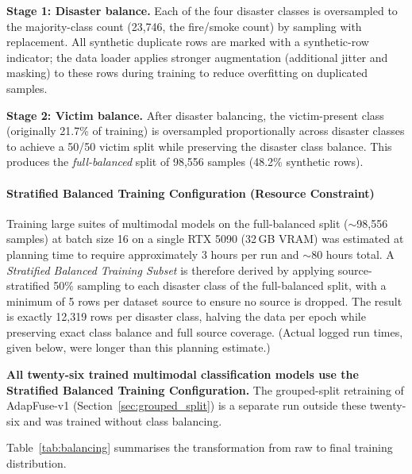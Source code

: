 \documentclass[journal]{IEEEtran}
\begin{document}
\textbf{Stage 1: Disaster balance.} Each of the four disaster classes is oversampled to the majority-class count (23{,}746, the fire/smoke count) by sampling with replacement. All synthetic duplicate rows are marked with a synthetic-row indicator; the data loader applies stronger augmentation (additional jitter and masking) to these rows during training to reduce overfitting on duplicated samples.

\textbf{Stage 2: Victim balance.} After disaster balancing, the victim-present class (originally 21.7\% of training) is oversampled proportionally across disaster classes to achieve a 50/50 victim split while preserving the disaster class balance. This produces the \textit{full-balanced} split of 98{,}556 samples (48.2\% synthetic rows).

\paragraph{Stratified Balanced Training Configuration (Resource Constraint)}

Training large suites of multimodal models on the full-balanced split ($\sim$98{,}556 samples) at batch size 16 on a single RTX 5090 (32\,GB VRAM) was estimated at planning time to require approximately 3 hours per run and $\sim$80 hours total. A \textit{Stratified Balanced Training Subset} is therefore derived by applying source-stratified 50\% sampling to each disaster class of the full-balanced split, with a minimum of 5 rows per dataset source to ensure no source is dropped. The result is exactly 12{,}319 rows per disaster class, halving the data per epoch while preserving exact class balance and full source coverage. (Actual logged run times, given below, were longer than this planning estimate.)

\textbf{All twenty-six trained multimodal classification models use the Stratified Balanced Training Configuration.} The grouped-split retraining of AdapFuse-v1 (Section~\ref{sec:grouped_split}) is a separate run outside these twenty-six and was trained without class balancing.

Table~\ref{tab:balancing} summarises the transformation from raw to final training distribution.
\end{document}
